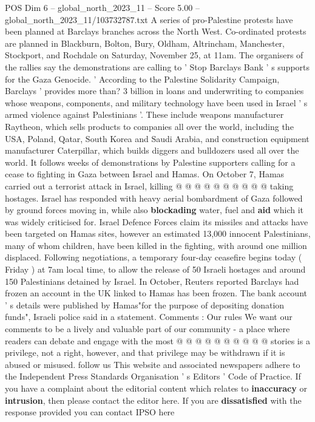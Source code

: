 \begin{textsample}{POS Dim 6 – global\_north\_2023\_11 – Score 5.00 – global\_north\_2023\_11/103732787.txt}  \label{ex:f6_pos_215}
A series of pro-Palestine protests have been planned at Barclays branches across the North West.
Co-ordinated protests are planned in Blackburn, Bolton, Bury, Oldham, Altrincham, Manchester, Stockport, and Rochdale on Saturday, November 25, at 11am.
The organisers of the rallies say the demonstrations are calling to ' Stop Barclays Bank ' s supports for the Gaza Genocide. ' According to the Palestine Solidarity Campaign, Barclays ' provides more than? 3 billion in loans and underwriting to companies whose weapons, components, and military technology have been used in Israel ' s armed violence against Palestinians '.
These include weapons manufacturer Raytheon, which sells products to companies all over the world, including the USA, Poland, Qatar, South Korea and Saudi Arabia, and construction equipment manufacturer Caterpillar, which builds diggers and bulldozers used all over the world.
It follows weeks of demonstrations by Palestine supporters calling for a cease to fighting in Gaza between Israel and Hamas.
On October 7, Hamas carried out a terrorist attack in Israel, killing @ @ @ @ @ @ @ @ @ @ taking hostages.
Israel has responded with heavy aerial bombardment of Gaza followed by ground forces moving in, while also \textbf{blockading} water, fuel and \textbf{aid} which it was widely criticised for.
Israel Defence Forces claim its missiles and attacks have been targeted on Hamas sites, however an estimated 13,000 innocent Palestinians, many of whom children, have been killed in the fighting, with around one million displaced.
Following negotiations, a temporary four-day ceasefire begins today ( Friday ) at 7am local time, to allow the release of 50 Israeli hostages and around 150 Palestinians detained by Israel.
In October, Reuters reported Barclays had frozen an account in the UK linked to Hamas has been frozen.
The bank account ' s details were published by Hamas"for the purpose of depositing donation funds", Israeli police said in a statement.
Comments : Our rules We want our comments to be a lively and valuable part of our community - a place where readers can debate and engage with the most @ @ @ @ @ @ @ @ @ @ stories is a privilege, not a right, however, and that privilege may be withdrawn if it is abused or misused. follow us This website and associated newspapers adhere to the Independent Press Standards Organisation ' s Editors ' Code of Practice.
If you have a complaint about the editorial content which relates to \textbf{inaccuracy} or \textbf{intrusion}, then please contact the editor here.
If you are \textbf{dissatisfied} with the response provided you can contact IPSO here

\end{textsample}
